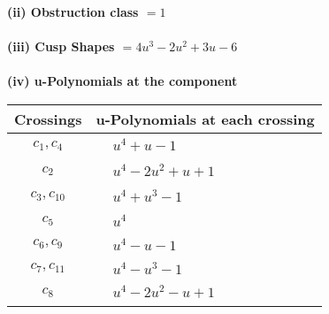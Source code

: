 \documentclass[1p]{elsarticle_modified}
\theoremstyle{definition}
\begin{document}
\flushleft \textbf{(ii) Obstruction class $= 1$}\\~\\
\flushleft \textbf{(iii) Cusp Shapes $= 4 u^3-2 u^2+3 u-6$}\\~\\
\newpage\renewcommand{\arraystretch}{1}
\flushleft \textbf{(iv) u-Polynomials at the component}\newline \\
\begin{tabular}{m{50pt}|m{274pt}}
Crossings & \hspace{64pt}u-Polynomials at each crossing \\
\hline $$\begin{aligned}c_{1},c_{4}\end{aligned}$$&$\begin{aligned}
&u^4+u-1
\end{aligned}$\\
\hline $$\begin{aligned}c_{2}\end{aligned}$$&$\begin{aligned}
&u^4-2 u^2+u+1
\end{aligned}$\\
\hline $$\begin{aligned}c_{3},c_{10}\end{aligned}$$&$\begin{aligned}
&u^4+u^3-1
\end{aligned}$\\
\hline $$\begin{aligned}c_{5}\end{aligned}$$&$\begin{aligned}
&u^4
\end{aligned}$\\
\hline $$\begin{aligned}c_{6},c_{9}\end{aligned}$$&$\begin{aligned}
&u^4- u-1
\end{aligned}$\\
\hline $$\begin{aligned}c_{7},c_{11}\end{aligned}$$&$\begin{aligned}
&u^4- u^3-1
\end{aligned}$\\
\hline $$\begin{aligned}c_{8}\end{aligned}$$&$\begin{aligned}
&u^4-2 u^2- u+1
\end{aligned}$\\
\hline
\end{tabular}\\~\\
\end{document}
